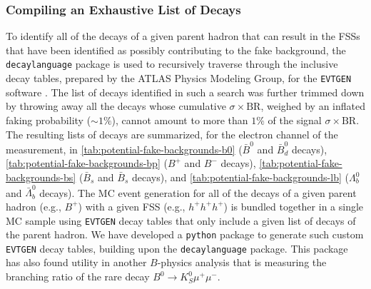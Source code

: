 \subsubsection*{Compiling an Exhaustive List of Decays}
To identify all of the decays of a given parent hadron that can result in the FSSs that have been identified as possibly contributing to the fake background, the \texttt{decaylanguage} package \cite{Rodrigues_DecayLanguage} is used to recursively traverse through the inclusive decay tables, prepared by the ATLAS Physics Modeling Group, for the \texttt{EVTGEN} software \cite{Lange:2001uf}. The list of decays identified in such a search was further trimmed down by throwing away all the decays whose cumulative $\sigma \times {\text{BR}}$, weighed by an inflated faking probability ($\sim 1\%$), cannot amount to more than $1\%$ of the signal $\sigma \times {\text{BR}}$. The resulting lists of decays are summarized, for the electron channel of the measurement, in \ref{tab:potential-fake-backgrounds-b0} ($\bar{B}^0$ and $\bar{B}^0_d$ decays), \ref{tab:potential-fake-backgrounds-bp} ($B^+$ and $B^-$ decays), \ref{tab:potential-fake-backgrounds-bs} ($\bar{B}_s$ and $\bar{B}_s$ decays), and \ref{tab:potential-fake-backgrounds-lb} ($\Lambda_b^0$ and $\bar\Lambda_b^0$ decays). %
The MC event generation for all of the decays of a given parent hadron (e.g., $B^+$) with a given FSS (e.g., $h^+h^+h^+$) is bundled together in a single MC sample using \texttt{EVTGEN} decay tables that only include a given list of decays of the parent hadron. %
We have developed a \texttt{python} package to generate such custom \texttt{EVTGEN} decay tables, building upon the \texttt{decaylanguage} package. %
This package has also found utility in another $B$-physics analysis that is measuring the branching ratio of the rare decay $B^0 \to K_S^0 \mu^+ \mu^-$.
%
